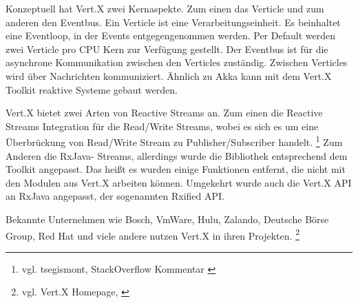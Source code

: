 Konzeptuell hat Vert.X zwei Kernaspekte. Zum einen das Verticle und zum anderen den Eventbus. Ein Verticle ist eine Verarbeitungseinheit. Es beinhaltet eine Eventloop, in der Events entgegengenommen werden. Per Default werden zwei Verticle pro CPU Kern zur Verfügung gestellt. Der Eventbus ist für die asynchrone Kommunikation zwischen den Verticles zuständig. Zwischen Verticles wird über Nachrichten kommuniziert. Ähnlich zu Akka kann mit dem Vert.X Toolkit reaktive Systeme gebaut werden. 

Vert.X bietet zwei Arten von Reactive Streams an. Zum einen die Reactive Streams Integration für die Read/Write Streams, wobei es sich es um eine Überbrückung von Read/Write Stream zu Publisher/Subscriber handelt. \footnote{vgl. tsegismont, StackOverflow Kommentar \cite{web:site:stackoverflow:vertx:comment}} Zum Anderen die RxJava- Streams, allerdings wurde die Bibliothek entsprechend dem Toolkit angepasst. Das heißt es wurden einige Funktionen entfernt, die nicht mit den Modulen aus Vert.X arbeiten können. Umgekehrt wurde auch die Vert.X API an RxJava angepasst, der sogenannten Rxified API.

Bekannte Unternehmen wie Bosch, VmWare, Hulu, Zalando, Deutsche Börse Group, Red Hat und viele andere nutzen Vert.X in ihren Projekten. \footnote{vgl. Vert.X Homepage, \cite{web:site:vertx}}